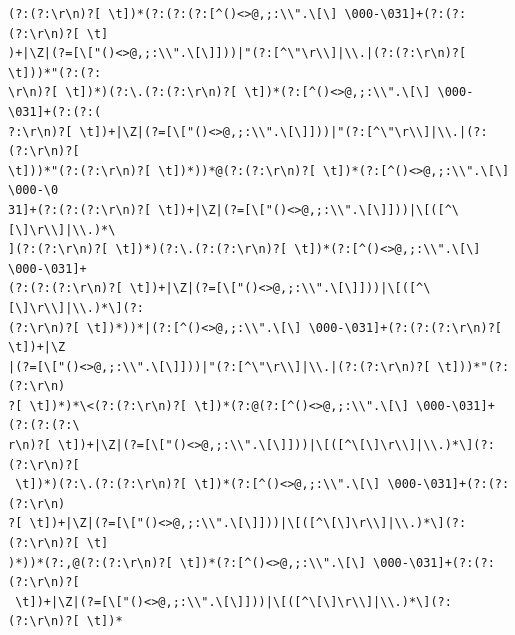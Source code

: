 \documentclass[]{book}
\begin{document}
\begin{verbatim}
(?:(?:\r\n)?[ \t])*(?:(?:(?:[^()<>@,;:\\".\[\] \000-\031]+(?:(?:(?:\r\n)?[ \t]
)+|\Z|(?=[\["()<>@,;:\\".\[\]]))|"(?:[^\"\r\\]|\\.|(?:(?:\r\n)?[ \t]))*"(?:(?:
\r\n)?[ \t])*)(?:\.(?:(?:\r\n)?[ \t])*(?:[^()<>@,;:\\".\[\] \000-\031]+(?:(?:(
?:\r\n)?[ \t])+|\Z|(?=[\["()<>@,;:\\".\[\]]))|"(?:[^\"\r\\]|\\.|(?:(?:\r\n)?[ 
\t]))*"(?:(?:\r\n)?[ \t])*))*@(?:(?:\r\n)?[ \t])*(?:[^()<>@,;:\\".\[\] \000-\0
31]+(?:(?:(?:\r\n)?[ \t])+|\Z|(?=[\["()<>@,;:\\".\[\]]))|\[([^\[\]\r\\]|\\.)*\
](?:(?:\r\n)?[ \t])*)(?:\.(?:(?:\r\n)?[ \t])*(?:[^()<>@,;:\\".\[\] \000-\031]+
(?:(?:(?:\r\n)?[ \t])+|\Z|(?=[\["()<>@,;:\\".\[\]]))|\[([^\[\]\r\\]|\\.)*\](?:
(?:\r\n)?[ \t])*))*|(?:[^()<>@,;:\\".\[\] \000-\031]+(?:(?:(?:\r\n)?[ \t])+|\Z
|(?=[\["()<>@,;:\\".\[\]]))|"(?:[^\"\r\\]|\\.|(?:(?:\r\n)?[ \t]))*"(?:(?:\r\n)
?[ \t])*)*\<(?:(?:\r\n)?[ \t])*(?:@(?:[^()<>@,;:\\".\[\] \000-\031]+(?:(?:(?:\
r\n)?[ \t])+|\Z|(?=[\["()<>@,;:\\".\[\]]))|\[([^\[\]\r\\]|\\.)*\](?:(?:\r\n)?[
 \t])*)(?:\.(?:(?:\r\n)?[ \t])*(?:[^()<>@,;:\\".\[\] \000-\031]+(?:(?:(?:\r\n)
?[ \t])+|\Z|(?=[\["()<>@,;:\\".\[\]]))|\[([^\[\]\r\\]|\\.)*\](?:(?:\r\n)?[ \t]
)*))*(?:,@(?:(?:\r\n)?[ \t])*(?:[^()<>@,;:\\".\[\] \000-\031]+(?:(?:(?:\r\n)?[
 \t])+|\Z|(?=[\["()<>@,;:\\".\[\]]))|\[([^\[\]\r\\]|\\.)*\](?:(?:\r\n)?[ \t])*

\end{verbatim}
\end{document}
